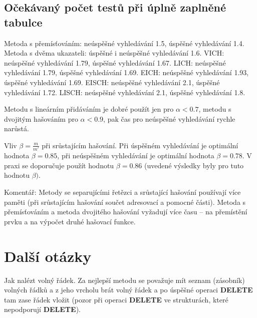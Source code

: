 \documentclass[a4paper,12pt]{article}
\begin{document}
\subsection{
Očekávaný počet testů při úplně zaplněné 
tabulce
}

\phantom{---}Metoda s přemísťováním: neúspěšné vyhledávání 1.5, úspěšné 
vyhledávání 1.4.\newline 
\phantom{---}Metoda s dvěma ukazateli: úspěšné i neúspěšné vyhledávání  1.6.\newline 
\phantom{---}VICH: neúspěšné vyhledávání 1.79, úspěšné vyhledávání 
1.67.\newline 
\phantom{---}LICH: neúspěšné vyhledávání 1.79, úspěšné vyhledávání 
1.69.\newline 
\phantom{---}EICH: neúspěšné vyhledávání 1.93, úspěšné vyhledávání 
1.69.\newline 
\phantom{---}EISCH: neúspěšné vyhledávání 2.1, úspěšné vyhledávání 
1.72.\newline 
\phantom{---}LISCH: neúspěšné vyhledávání 2.1, úspěšné vyhledávání 
1.8.

Metodu s lineárním přidáváním je dobré použít jen pro 
$\alpha <0.7$, metodu s dvojitým hašováním pro $\alpha 
<0.9$, pak 
čas pro neúspěšné vyhledávání rychle narůstá.

Vliv $\beta =\frac m{m'}$ při srůstajícím hašování.\newline 
Při 
úspěšném vy\-hledávání je optimální hodnota $
\beta =0.85$, při 
neúspěšném vy\-hledávání je optimální hodnota $
\beta =0.78$. 
V praxi se doporučuje použít hodnotu $\beta =0.86$ (uvedené 
výsledky byly pro tuto hodnotu $\beta ).$

Komentář: Metody se separujícími řetězci a 
srůstající hašování používají více paměti (při 
srůstajícím hašování součet adresovací a 
pomocné části). Metoda s přemísťováním a metoda 
dvojitého hašování vyžadují více času -- na přemístění 
prvku a na výpočet druhé hašovací funkce.

\section{Další otázky}

Jak nalézt volný řádek.\newline 
Za nejlepší metodu se považuje mít seznam (zásobník) 
volných řádků a z jeho vrcholu brát volný řádek 
a po úspěšné operaci {\bf DELETE} tam zase řádek vložit 
(pozor při operaci {\bf DELETE} ve strukturách, které 
nepodporují {\bf DELETE}).
\end{document}
